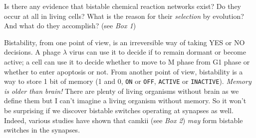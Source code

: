 \documentclass[]{resonance}
\begin{document}
Is there any evidence that bistable chemical reaction networks exist? Do they
occur at all in living cells?  What is the reason for their \emph{selection} by
evolution? And what do they accomplish? (see \textit{Box 1})

Bistability, from one point of view, is an irreversible way of taking YES or NO
decisions. A phage $\lambda$ virus can use it to decide if to remain dormant or
become active; a cell can use it to decide whether to move to M phase from G1
phase or whether to enter apoptosis or not. From another point of view,
bistability is a way to store 1 bit of memory (1 and 0, \texttt{ON} or
\texttt{OFF}, \texttt{ACTIVE} or \texttt{INACTIVE}). \emph{Memory is older than
brain!} There are plenty of living organisms without brain as we define them but
I can't imagine a living organism without memory. So it won't be surprising if
we discover bistable switches operating at synapses as well. Indeed, various
studies have shown that \gls{camkii} (see \textit{Box 2}) \emph{may} form
bistable switches in the synapses. 
\end{document}
